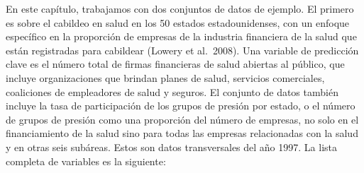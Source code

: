 \documentclass[
]{book}
\begin{document}
En este capítulo, trabajamos con dos conjuntos de datos de ejemplo. El primero es sobre el cabildeo en salud en los 50 estados estadounidenses, con un enfoque específico en la proporción de empresas de la industria financiera de la salud que están registradas para cabildear (Lowery et al.~2008). Una variable de predicción clave es el número total de firmas financieras de salud abiertas al público, que incluye organizaciones que brindan planes de salud, servicios comerciales, coaliciones de empleadores de salud y seguros. El conjunto de datos también incluye la tasa de participación de los grupos de presión por estado, o el número de grupos de presión como una proporción del número de empresas, no solo en el financiamiento de la salud sino para todas las empresas relacionadas con la salud y en otras seis subáreas. Estos son datos transversales del año 1997. La lista completa de variables es la siguiente:
\end{document}

